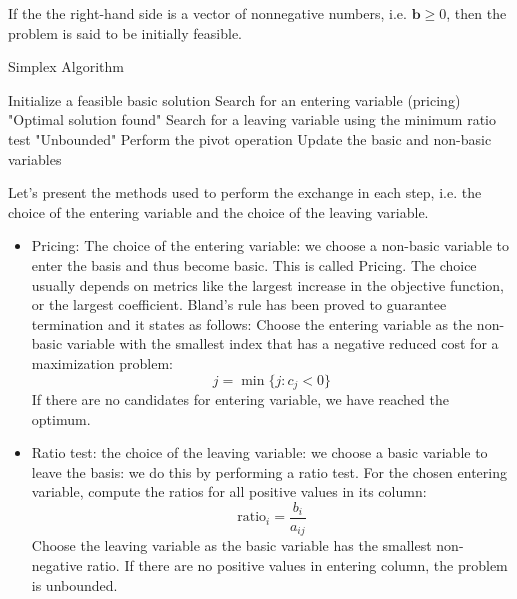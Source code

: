 If the the right-hand side is a vector of nonnegative numbers, i.e. $\mathbf{b} \geq 0 $, then
the problem is said to be initially feasible.


\begin{algorithm}
    \caption{Simplex Algorithm}
    \begin{algorithmic}[1]
        \State Initialize a feasible basic solution
        \State Search for an entering variable (pricing)
        \State \Return "Optimal solution found"
        \EndIf
        \State Search for a leaving variable using the minimum ratio test
        \State \Return "Unbounded"
        \EndIf
        \State Perform the pivot operation
        \State Update the basic and non-basic variables
        \EndWhile
        \EndProcedure
    \end{algorithmic}
    \label{algo:simplex_tableau}
\end{algorithm}


Let's present the methods used to perform the exchange in each step, i.e. the choice of the entering
variable and the choice of the leaving variable.

\begin{itemize}
    \item Pricing: The choice of the entering variable: we choose a non-basic variable to enter the basis
          and thus become basic. This is called Pricing. The choice usually depends on metrics
          like the largest increase in the objective function, or the largest coefficient.
          Bland's rule has been proved to guarantee termination and it states as follows:
          Choose the entering variable as the non-basic variable with
          the smallest index that has a negative reduced cost for a maximization problem:
          \[
              j = \min \{ j : c_j < 0 \}
          \]
          If there are no candidates for entering variable, we have reached the optimum.
    \item Ratio test: the choice of the leaving variable: we choose a basic variable to leave the basis:
          we do this by performing a ratio test.
          For the chosen entering variable, compute the ratios for all positive values in its column:
          \[
              \text{ratio}_i = \frac{b_i}{a_{ij}}
          \]
          Choose the leaving variable as the basic variable  has the smallest non-negative ratio.
          If there are no positive values in entering column, the problem is unbounded.
\end{itemize}

